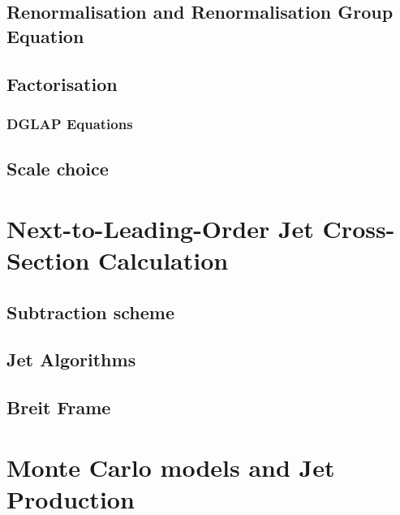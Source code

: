 \subsection{Renormalisation and Renormalisation Group Equation}


\subsection{Factorisation}
\label{subsec:factorisation}


\subsubsection{DGLAP Equations}


\subsection{Scale choice}


\section{Next-to-Leading-Order Jet Cross-Section Calculation}


\subsection{Subtraction scheme}
\label{subsec:subscheme}

 
\subsection{Jet Algorithms}
\label{subsec:jetalgo}

%

\subsection{Breit Frame}
\label{subsec:breitframe}


%

\section{Monte Carlo models and Jet Production}
